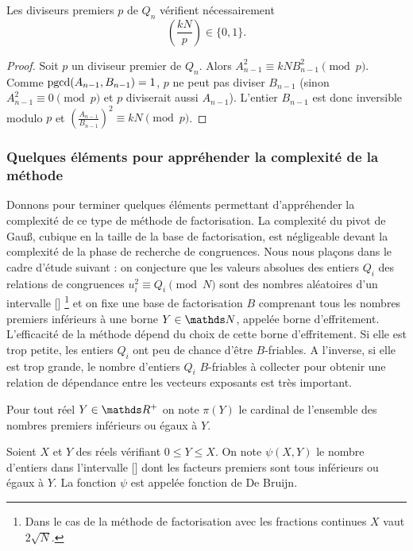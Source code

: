 \begin{proposition}
	Les diviseurs premiers $p$ de $Q_n$ vérifient nécessairement
	\[\left(\frac{kN}{p} \right) \in \{0, 1\}.\]
\end{proposition}

\begin{proof}
	Soit $p$ un diviseur premier de $Q_n$. Alors $ A_{n-1}^2 \equiv kNB_{n-1}^2
	\pmod{p}$. Comme $\operatorname{pgcd}(A_{n-1},B_{n-1}) = 1$, $p$ ne peut pas diviser
	$B_{n-1}$ (sinon $A_{n-1}^2 \equiv 0 \pmod{p}$ et $p$ diviserait aussi
	$A_{n-1}$). L'entier $B_{n-1}$ est donc inversible modulo $p$ et $\left(
	\frac{A_{n-1}}{B_{n-1}}\right )^2 \equiv kN \pmod{p}$.
\end{proof}

\subsubsection{Quelques éléments pour appréhender la complexité de la méthode}


Donnons pour terminer quelques éléments permettant d'appréhender la complexité 
de ce type de méthode de factorisation. La complexité du pivot de Gau\ss{}, 
cubique en la taille de la base de factorisation, est négligeable devant la 
complexité de la phase de recherche de congruences. Nous nous plaçons dans le 
cadre d'étude suivant : on conjecture que les valeurs absolues des entiers $Q_i$ 
des relations de congruences $u_i^2 \equiv Q_i \pmod{N}$ sont des nombres 
aléatoires d'un intervalle [\![1, X]\!] \footnote{Dans le cas de la méthode de 
factorisation avec les fractions continues $X$ vaut $2\sqrt{N}$. } et on fixe 
une base de factorisation $B$ comprenant tous les nombres premiers inférieurs à une 
borne $Y \in \N$, appelée borne d'effritement. L'efficacité de la méthode dépend du
choix de cette borne d'effritement. Si elle est trop petite, les entiers $Q_i$
ont peu de chance d'être $B$-friables. A l'inverse, si elle est trop grande, le
nombre d'entiers $Q_i$ $B$-friables à collecter pour obtenir une relation de 
dépendance entre les vecteurs exposants est très important.
\begin{notation}
    Pour tout réel $Y \in \R^+$ on note $\pi(Y)$ le cardinal de l'ensemble des
    nombres premiers inférieurs ou égaux à $Y$.
\end{notation}
\begin{notation}
    Soient $X$ et $Y$ des réels vérifiant $0 \leq Y \leq X$. On note $\psi(X,Y)$
    le nombre d'entiers dans l'intervalle [\![1, X]\!]  dont les facteurs premiers  
    sont tous inférieurs ou égaux à $Y$. La fonction $\psi$ est appelée fonction 
    de De Bruijn.
\end{notation}

